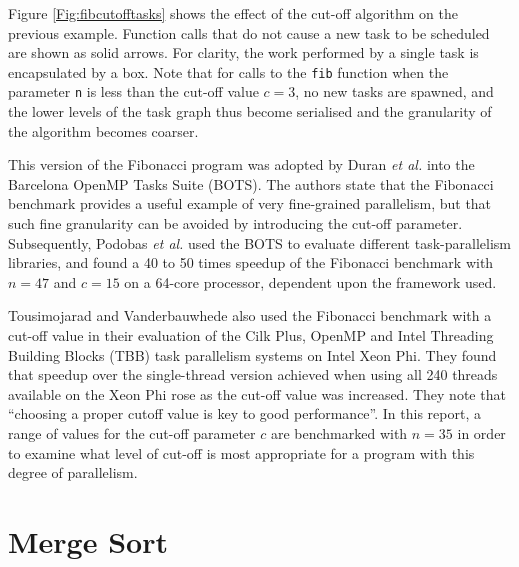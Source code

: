 \documentclass{report}
\begin{document}
Figure \ref{Fig:fibcutofftasks} shows the effect of the cut-off algorithm on the previous example. Function calls that do not cause a new task to be scheduled are shown as solid arrows. For clarity, the work performed by a single task is encapsulated by a box. Note that for calls to the \verb!fib! function when the parameter \verb!n! is less than the cut-off value \(c=3\), no new tasks are spawned, and the lower levels of the task graph thus become serialised and the granularity of the algorithm becomes coarser.

This version of the Fibonacci program was adopted by Duran \textit{et al.}\cite{Duran09} into the Barcelona OpenMP Tasks Suite (BOTS). The authors state that the Fibonacci benchmark provides a useful example of very fine-grained parallelism, but that such fine granularity can be avoided by introducing the cut-off parameter. Subsequently, Podobas \textit{et al.}\cite{Podobas15} used the BOTS to evaluate different task-parallelism libraries, and found a 40 to 50 times speedup of the Fibonacci benchmark with \(n=47\) and \(c=15\) on a 64-core processor, dependent upon the framework used.

Tousimojarad and Vanderbauwhede\cite{Tousimojarad14} also used the Fibonacci benchmark with a cut-off value in their evaluation of the Cilk Plus, OpenMP and Intel Threading Building Blocks (TBB) task parallelism systems on Intel Xeon Phi. They found that speedup over the single-thread version achieved when using all 240 threads available on the Xeon Phi rose as the cut-off value was increased. They note that ``choosing a proper cutoff value is key to good performance''. In this report, a range of values for the cut-off parameter \(c\) are benchmarked with \(n=35\) in order to examine what level of cut-off is most appropriate for a program with this degree of parallelism.

\section{Merge Sort} \label{Sec:mergesort}
\end{document}
